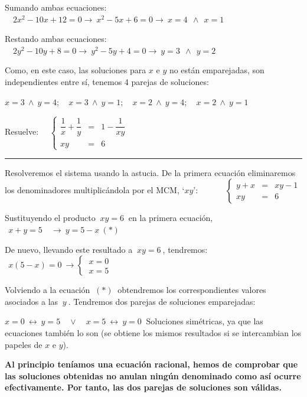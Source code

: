 \begin{miejemplo}
\vspace{2mm} Sumando ambas ecuaciones: $\quad 2x^2-10x+12=0  \to \ x^2-5x+6=0 \to \ x=4\ \ \wedge \ \ x=1$

\vspace{2mm} Restando ambas ecuaciones: $\quad 2y^2-10y+8=0  \to \ y^2-5y+4=0 \to \ y=3\ \ \wedge \ \ y=2$

\vspace{2mm} Como, en este caso, las soluciones para $x$ e $y$ no están emparejadas, son independientes entre sí, tenemos 4 parejas de soluciones:

\vspace{2mm} $x=3 \ \wedge \ y=4;\quad x=3 \ \wedge \ y=1;\quad 
x=2 \ \wedge \ y=4;\quad x=2 \ \wedge \ y=1$
 	
\end{miejemplo}

\begin{miejercicio}

Resuelve: $\quad \left\{ \begin{array}{rrr} \dfrac 1 x + \dfrac 1 y &=&1-\dfrac{1}{xy} \\ xy &=& 6 \end{array} \right.$

\rule{250pt}{0.1pt}

\vspace{2mm} Resolveremos el sistema usando la astucia. De la primera ecuación eliminaremos los denominadores multiplicándola por el MCM, `$xy$': $\qquad \quad \left\{ \begin{array}{rrr}  y+x&=&xy-1 \\ xy &=& 6 \end{array} \right.$

\vspace{2mm} Sustituyendo el producto $\ xy=6\ $ en la primera ecuación, $\ \ x+y=5 \quad  \to \ y=5-x \ (*)\ $ 

\vspace{2mm}  De nuevo, llevando este resultado a $\ xy=6\ $, tendremos:
$\ \ x(5-x)=0 \ \to  \begin{cases} \ x=0 \\ \ x=5 \end{cases}$

\vspace{2mm}  Volviendo a la ecuación $\ (*)\ $ obtendremos los correspondientes valores asociados a las $\ y \ $. Tendremos dos parejas de soluciones emparejadas:

\vspace{2mm} $x=0 \ \leftrightarrow \ y=5 \quad \vee \quad x=5 \ \leftrightarrow \ y=0\ $ Soluciones simétricas, ya que las ecuaciones también lo son (se obtiene los mismos resultados si se intercambian los papeles de $x$ e $y$). 

\vspace{2mm} \textbf{Al principio teníamos una ecuación racional, hemos de comprobar que las soluciones obtenidas no anulan ningún denominado como así ocurre efectivamente. Por tanto, las dos parejas de soluciones son válidas.}
	
\end{miejercicio}


